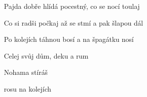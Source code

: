 \begin{song}
\bigskip

Pajda dobře hlídá pocestný, co se nocí toulaj \par
Co si radši počkaj až se stmí a pak šlapou dál \par
Po kolejích  táhnou bosí a na špagátku nosí \par
Celej svůj dům,   deku a rum \par

\bigskip

\Refren

\bigskip

Nohama stíráš \par
{}rosu na kolejích \par

\end{song}